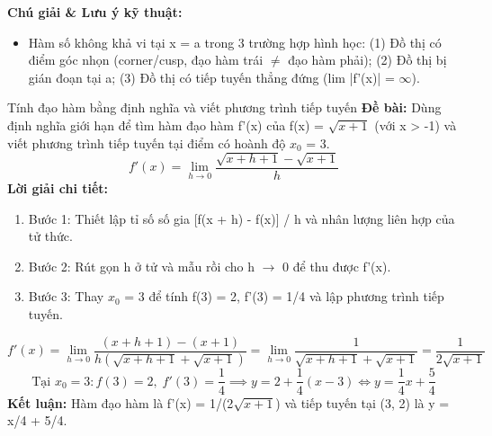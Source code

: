 \documentclass[11pt,a4paper,oneside]{book}
\begin{document}
\noindent\textbf{Chú giải \& Lưu ý kỹ thuật:}
\begin{itemize}[leftmargin=1.5em, itemsep=2pt]
  \item Hàm số không khả vi tại x = a trong 3 trường hợp hình học: (1) Đồ thị có điểm góc nhọn (corner/cusp, đạo hàm trái $\neq$  đạo hàm phải); (2) Đồ thị bị gián đoạn tại a; (3) Đồ thị có tiếp tuyến thẳng đứng (lim |f'(x)| = $\infty$).
\end{itemize}

\begin{vidu}{Tính đạo hàm bằng định nghĩa và viết phương trình tiếp tuyến}
\textbf{Đề bài:} Dùng định nghĩa giới hạn để tìm hàm đạo hàm f'(x) của f(x) = $\sqrt{x + 1}$ (với x > -1) và viết phương trình tiếp tuyến tại điểm có hoành độ $x_0$ = 3.
\[ f'(x) = \lim_{h \to 0} \frac{\sqrt{x + h + 1} - \sqrt{x + 1}}{h} \]
\textbf{Lời giải chi tiết:}
\begin{enumerate}[leftmargin=1.5em, itemsep=2pt]
  \item Bước 1: Thiết lập tỉ số số gia [f(x + h) - f(x)] / h và nhân lượng liên hợp của tử thức.
  \item Bước 2: Rút gọn h ở tử và mẫu rồi cho h $\to$  0 để thu được f'(x).
  \item Bước 3: Thay $x_0$ = 3 để tính f(3) = 2, f'(3) = 1/4 và lập phương trình tiếp tuyến.
\end{enumerate}
\[ f'(x) = \lim_{h \to 0} \frac{(x + h + 1) - (x + 1)}{h\left(\sqrt{x + h + 1} + \sqrt{x + 1}\right)} = \lim_{h \to 0} \frac{1}{\sqrt{x + h + 1} + \sqrt{x + 1}} = \frac{1}{2\sqrt{x + 1}} \]
\[ \text{Tại } x_0 = 3: f(3) = 2, \; f'(3) = \frac{1}{4} \implies y = 2 + \frac{1}{4}(x - 3) \iff y = \frac{1}{4}x + \frac{5}{4} \]
\noindent\textbf{Kết luận:} Hàm đạo hàm là f'(x) = 1/(2$\sqrt{x+1}$) và tiếp tuyến tại (3, 2) là y = x/4 + 5/4.
\end{vidu}
\end{document}
